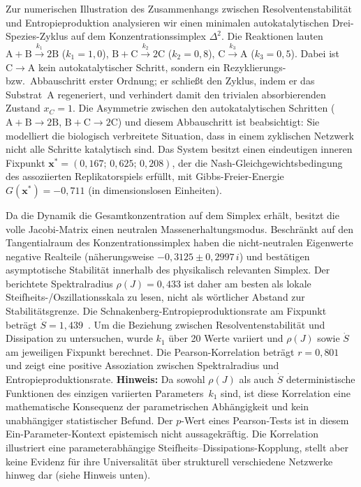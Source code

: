 \documentclass[12pt,a4paper]{article}
\theoremstyle{remark}
\begin{document}
Zur numerischen Illustration des Zusammenhangs zwischen Resolventenstabilität und Entropieproduktion analysieren wir einen minimalen autokatalytischen Drei-Spezies-Zyklus auf dem Konzentrationssimplex $\Delta^2$.
Die Reaktionen lauten $\mathrm{A}+\mathrm{B}\xrightarrow{k_1}2\mathrm{B}$ ($k_1=1{,}0$), $\mathrm{B}+\mathrm{C}\xrightarrow{k_2}2\mathrm{C}$ ($k_2=0{,}8$), $\mathrm{C}\xrightarrow{k_3}\mathrm{A}$ ($k_3=0{,}5$).
Dabei ist $\mathrm{C}\to\mathrm{A}$ kein autokatalytischer Schritt, sondern ein Rezyklierungs- bzw.\ Abbauschritt erster Ordnung; er schließt den Zyklus, indem er das Substrat~A regeneriert, und verhindert damit den trivialen absorbierenden Zustand $x_C=1$. Die Asymmetrie zwischen den autokatalytischen Schritten ($\mathrm{A}+\mathrm{B}\to 2\mathrm{B}$, $\mathrm{B}+\mathrm{C}\to 2\mathrm{C}$) und diesem Abbauschritt ist beabsichtigt: Sie modelliert die biologisch verbreitete Situation, dass in einem zyklischen Netzwerk nicht alle Schritte katalytisch sind.
Das System besitzt einen eindeutigen inneren Fixpunkt $\mathbf{x}^*=(0{,}167;\,0{,}625;\,0{,}208)$, der die Nash-Gleichgewichtsbedingung des assoziierten Replikatorspiels erfüllt, mit Gibbs-Freier-Energie $G(\mathbf{x}^*)=-0{,}711$ (in dimensionslosen Einheiten).

Da die Dynamik die Gesamtkonzentration auf dem Simplex erhält, besitzt die volle Jacobi-Matrix einen neutralen Massenerhaltungsmodus. Beschränkt auf den Tangentialraum des Konzentrationssimplex haben die nicht-neutralen Eigenwerte negative Realteile (näherungsweise $-0{,}3125 \pm 0{,}2997\,i$) und bestätigen asymptotische Stabilität innerhalb des physikalisch relevanten Simplex. Der berichtete Spektralradius $\rho(J)=0{,}433$ ist daher am besten als lokale Steifheits-/Oszillationsskala zu lesen, nicht als wörtlicher Abstand zur Stabilitätsgrenze.
Die Schnakenberg-Entropieproduktionsrate am Fixpunkt beträgt $\dot{S}=1{,}439$~\citep{Schnakenberg1976}.
Um die Beziehung zwischen Resolventenstabilität und Dissipation zu untersuchen, wurde $k_1$ über 20 Werte variiert und $\rho(J)$ sowie $\dot{S}$ am jeweiligen Fixpunkt berechnet.
Die Pearson-Korrelation beträgt $r=0{,}801$ und zeigt eine positive Assoziation zwischen Spektralradius und Entropieproduktionsrate. \textbf{Hinweis:} Da sowohl $\rho(J)$ als auch $\dot{S}$ deterministische Funktionen des einzigen variierten Parameters~$k_1$ sind, ist diese Korrelation eine mathematische Konsequenz der parametrischen Abhängigkeit und kein unabhängiger statistischer Befund. Der $p$-Wert eines Pearson-Tests ist in diesem Ein-Parameter-Kontext epistemisch nicht aussagekräftig. Die Korrelation illustriert eine parameterabhängige Steifheits--Dissipations-Kopplung, stellt aber keine Evidenz für ihre Universalität über strukturell verschiedene Netzwerke hinweg dar (siehe Hinweis unten).
\end{document}
